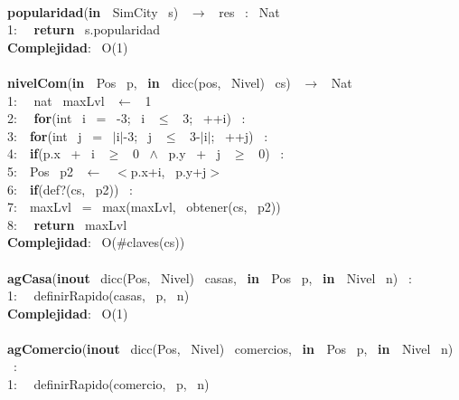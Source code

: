 \begin{Algoritmos}
\noindent\makebox[\linewidth]{\rule{\textwidth}{0.4pt}}
\\
\noindent\makebox[\linewidth]{\rule{\textwidth}{0.4pt}}
\textbf{popularidad}(\textbf{in \ }SimCity \ s) \ $\rightarrow $ \ res \ : \ Nat\\
1: \  \ \textbf{return} \ s.popularidad\\
\textbf{Complejidad}: \ O(1)\\
\noindent\makebox[\linewidth]{\rule{\textwidth}{0.4pt}}
\\
\noindent\makebox[\linewidth]{\rule{\textwidth}{0.4pt}}
\textbf{nivelCom}(\textbf{in \ }Pos \ p, \ \textbf{in \ }dicc(pos, \ Nivel) \ cs) \ $\rightarrow $ \ Nat\\
1: \  \ nat \ maxLvl \ $\leftarrow$ \ 1\\
2: \  \ \textbf{for}(int \ i \ = \ -3; \ i \ $\leq$ \ 3; \ ++i) \ :\\
3:\indent  \  \ \textbf{for}(int \ j \ = \ $\mid$i$\mid$-3; \ j \ $\leq$ \ 3-$\mid$i$\mid$; \ ++j) \ :\\
4:\indent \indent  \  \ \textbf{if}(p.x \ + \ i \ $\geq$ \ 0 \ $\wedge$ \ p.y \ + \ j \ $\geq$ \ 0) \ :\\
5:\indent \indent \indent  \  \ Pos \ p2 \ $\leftarrow$ \ $<$p.x+i, \ p.y+j$>$ \ \\
6:\indent \indent \indent  \  \ \textbf{if}(def?(cs, \ p2)) \ :\\
7:\indent \indent \indent \indent  \  \ maxLvl \ = \ max(maxLvl, \ obtener(cs, \ p2))\\
8: \  \ \textbf{return} \ maxLvl\\
\textbf{Complejidad}: \ O($ \# $claves(cs))\\
\noindent\makebox[\linewidth]{\rule{\textwidth}{0.4pt}}
\\
\noindent\makebox[\linewidth]{\rule{\textwidth}{0.4pt}}
\textbf{agCasa}(\textbf{inout} \ dicc(Pos, \ Nivel) \ casas, \ \textbf{in \ }Pos \ p, \ \textbf{in \ }Nivel \ n) \ :\\
1: \  \ definirRapido(casas, \ p, \ n)\\
\textbf{Complejidad}: \ O(1)\\
\noindent\makebox[\linewidth]{\rule{\textwidth}{0.4pt}}
\\
\noindent\makebox[\linewidth]{\rule{\textwidth}{0.4pt}}
\textbf{agComercio}(\textbf{inout} \ dicc(Pos, \ Nivel) \ comercios, \ \textbf{in \ }Pos \ p, \ \textbf{in \ }Nivel \ n) \ :\\
1: \  \ definirRapido(comercio, \ p, \ n)\\

\end{Algoritmos}
